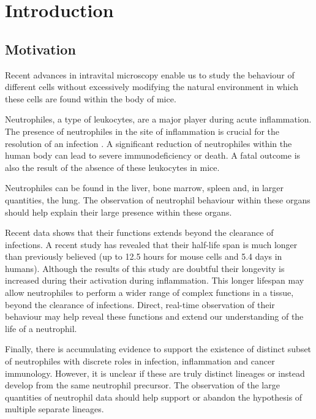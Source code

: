 	\chapter{Introduction }

	\section{Motivation }
		
		Recent advances in intravital microscopy enable us to study the behaviour of different cells without excessively modifying the natural environment in which these cells are found within the body of mice.
		
		
		Neutrophiles, a type of leukocytes, are a major player during acute inflammation. The presence of neutrophiles in the site of inflammation is crucial for the resolution of an infection \cite{kolku13}. A significant reduction of neutrophiles within the human body can lead to severe immunodeficiency or death. A fatal outcome is also the result of the absence of these leukocytes in mice.
		
		Neutrophiles can be found in the liver, bone marrow, spleen and, in larger quantities, the lung. The observation of neutrophil behaviour within these organs should help explain their large presence within these organs. 
		
		Recent data shows that their functions extends beyond the clearance of infections. A recent study \cite{pillay10} has revealed that their half-life span is much longer than previously believed (up to 12.5 hours for mouse cells and 5.4 days in humans). Although the results of this study are doubtful \cite{toft11} their longevity is increased during their activation during inflammation. This longer lifespan may allow neutrophiles to perform a wider range of complex functions in a tissue, beyond the clearance of infections. Direct, real-time observation of their behaviour may help reveal these functions and extend our understanding of the life of a neutrophil.
		
		Finally, there is accumulating evidence to support the existence of distinct subset of neutrophiles with discrete roles in infection, inflammation and cancer immunology. However, it is unclear if these are truly distinct lineages or instead develop from the same neutrophil precursor. The observation of the large quantities of neutrophil data should help support or abandon  the hypothesis of multiple separate lineages.
		

